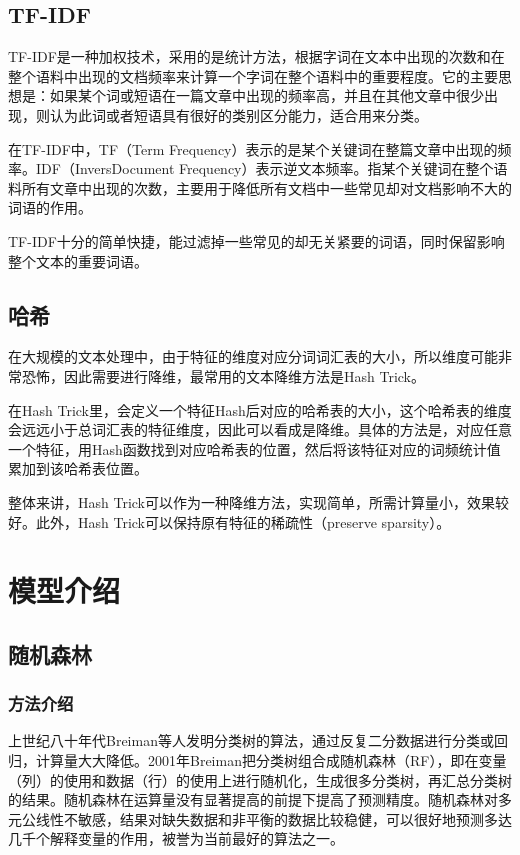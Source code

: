 \documentclass[a4paper]{article}
\begin{document}
\subsection{TF-IDF}
TF-IDF是一种加权技术，采用的是统计方法，根据字词在文本中出现的次数和在整个语料中出现的文档频率来计算一个字词在整个语料中的重要程度。它的主要思想是：如果某个词或短语在一篇文章中出现的频率高，并且在其他文章中很少出现，则认为此词或者短语具有很好的类别区分能力，适合用来分类。

在TF-IDF中，TF（Term Frequency）表示的是某个关键词在整篇文章中出现的频率。IDF（InversDocument Frequency）表示逆文本频率。指某个关键词在整个语料所有文章中出现的次数，主要用于降低所有文档中一些常见却对文档影响不大的词语的作用。

TF-IDF十分的简单快捷，能过滤掉一些常见的却无关紧要的词语，同时保留影响整个文本的重要词语。

\subsection{哈希}
在大规模的文本处理中，由于特征的维度对应分词词汇表的大小，所以维度可能非常恐怖，因此需要进行降维，最常用的文本降维方法是Hash Trick。

在Hash Trick里，会定义一个特征Hash后对应的哈希表的大小，这个哈希表的维度会远远小于总词汇表的特征维度，因此可以看成是降维。具体的方法是，对应任意一个特征，用Hash函数找到对应哈希表的位置，然后将该特征对应的词频统计值累加到该哈希表位置。

整体来讲，Hash Trick可以作为一种降维方法，实现简单，所需计算量小，效果较好。此外，Hash Trick可以保持原有特征的稀疏性（preserve sparsity）。


\section{模型介绍}


\subsection{随机森林}
\subsubsection{方法介绍}
上世纪八十年代Breiman等人\cite{leo1984classification}发明分类树的算法，通过反复二分数据进行分类或回归，计算量大大降低。2001年Breiman\cite{breiman2001random}把分类树组合成随机森林（RF），即在变量（列）的使用和数据（行）的使用上进行随机化，生成很多分类树，再汇总分类树的结果。随机森林在运算量没有显著提高的前提下提高了预测精度。随机森林对多元公线性不敏感，结果对缺失数据和非平衡的数据比较稳健，可以很好地预测多达几千个解释变量的作用，被誉为当前最好的算法之一\cite{iverson2008estimating}。
\end{document}
